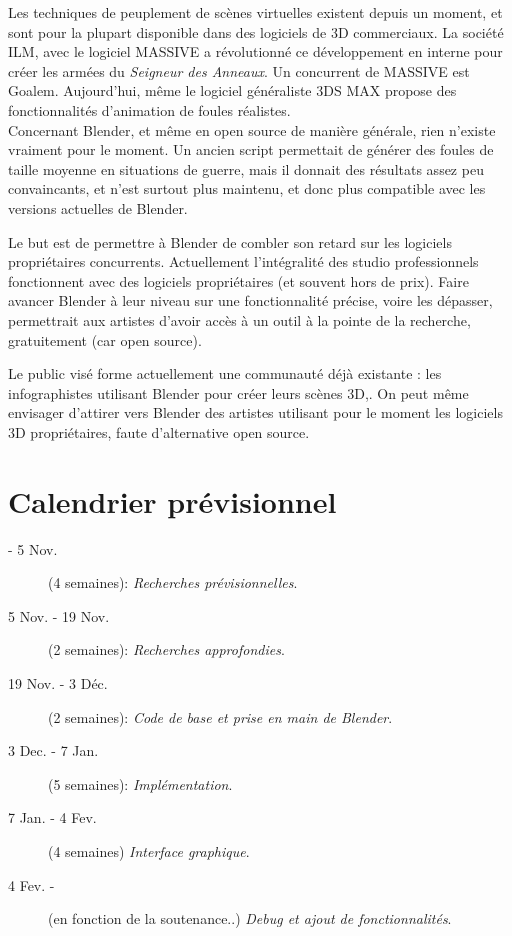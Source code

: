\documentclass[a4paper,12pt]{article}
\begin{document}
Les techniques de peuplement de scènes virtuelles existent depuis un moment, et sont pour la plupart disponible dans des logiciels de 3D commerciaux. La société ILM, avec le logiciel MASSIVE\cite{Massive} a révolutionné ce développement en interne pour créer les armées du \textit{Seigneur des Anneaux}. Un concurrent de MASSIVE est Goalem\cite{Golaem}. Aujourd'hui, même le logiciel généraliste 3DS MAX\cite{3dsmax} propose des fonctionnalités d'animation de foules réalistes. \\
Concernant Blender, et même en open source de manière générale, rien n'existe vraiment pour le moment. Un ancien script permettait de générer des foules de taille moyenne en situations de guerre, mais il donnait des résultats assez peu convaincants, et n'est surtout plus maintenu, et donc plus compatible avec les versions actuelles de Blender.

Le but est de permettre à Blender de combler son retard sur les logiciels propriétaires concurrents. Actuellement l'intégralité des studio professionnels fonctionnent avec des logiciels propriétaires (et souvent hors de prix). Faire avancer Blender à leur niveau sur une fonctionnalité précise, voire les dépasser, permettrait aux artistes d'avoir accès à un outil à la pointe de la recherche, gratuitement (car open source).

Le public visé forme actuellement une communauté déjà existante : les infographistes utilisant Blender pour créer leurs scènes 3D,. On peut même envisager d'attirer vers Blender des artistes utilisant pour le moment les logiciels 3D propriétaires, faute d'alternative open source.

\section{Calendrier prévisionnel}
\begin{description}
  \item[- 5 Nov.] (4 semaines):  \textit{Recherches prévisionnelles}. 
  \item[5 Nov. - 19 Nov.] (2 semaines): \textit{Recherches approfondies}.
  \item[19 Nov. - 3 Déc.] (2 semaines): \textit{Code de base et prise en main de Blender}.
  \item[3 Dec. - 7 Jan.] (5 semaines): \textit{Implémentation}.
  \item[7 Jan. - 4 Fev.] (4 semaines) \textit{Interface graphique}.
  \item[4 Fev. -] (en fonction de la soutenance..) \textit{Debug et ajout de fonctionnalités}.
\end{description}
\end{document}
